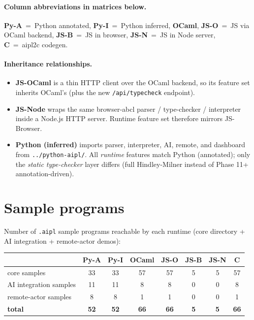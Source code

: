 \documentclass[10pt,a4paper,landscape]{article}
\begin{document}
\paragraph{Column abbreviations in matrices below.}
\textbf{Py-A}~=~Python annotated, \textbf{Py-I}~=~Python inferred,
\textbf{OCaml}, \textbf{JS-O}~=~JS via OCaml backend,
\textbf{JS-B}~=~JS in browser, \textbf{JS-N}~=~JS in Node server,
\textbf{C}~=~aipl2c codegen.

\paragraph{Inheritance relationships.}

\begin{itemize}[leftmargin=*,itemsep=0pt]
  \item \textbf{JS-OCaml} is a thin HTTP client over the OCaml
    backend, so its feature set inherits OCaml's (plus the new
    \texttt{/api/typecheck} endpoint).
  \item \textbf{JS-Node} wraps the same browser-abcl parser /
    type-checker / interpreter inside a Node.js HTTP server.
    Runtime feature set therefore mirrors JS-Browser.
  \item \textbf{Python (inferred)} imports parser, interpreter, AI,
    remote, and dashboard from \texttt{../python-aipl/}.  All
    \emph{runtime} features match Python (annotated); only the
    \emph{static type-checker} layer differs (full
    Hindley-Milner instead of Phase 11+ annotation-driven).
\end{itemize}

\clearpage

\section*{Sample programs}

Number of \texttt{.aipl} sample programs reachable by each runtime
(core directory + AI integration + remote-actor demos):

\begin{tabularx}{\linewidth}{l C C C C C C C}
  \toprule
  & \textbf{Py-A} & \textbf{Py-I} & \textbf{OCaml} & \textbf{JS-O} & \textbf{JS-B} & \textbf{JS-N} & \textbf{C} \\
  \midrule
  core samples           & 33   & 33   & 57   & 57   & 5    & 5    & 57   \\
  AI integration samples & 11   & 11   & 8    & 8    & 0    & 0    & 8    \\
  remote-actor samples   & 8    & 8    & 1    & 1    & 0    & 0    & 1    \\
  \midrule
  \textbf{total}         & \textbf{52} & \textbf{52} & \textbf{66} & \textbf{66} & \textbf{5} & \textbf{5} & \textbf{66} \\
  \bottomrule
\end{tabularx}
\end{document}
